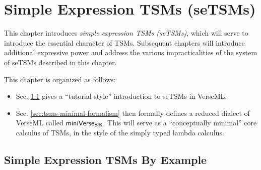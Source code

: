 \chapter{Simple Expression TSMs (seTSMs)}\label{chap:uetsms}
This chapter introduces \emph{simple expression TSMs (seTSMs)}, which will serve to introduce the essential character of TSMs. Subsequent chapters will introduce additional expressive power and address the various impracticalities of the system of seTSMs described in this chapter.

This chapter is organized as follows:%
\begin{itemize}
\item Sec. \ref{sec:tsms-by-example} gives a ``tutorial-style'' introduction to seTSMs in VerseML. %
\item Sec. \ref{sec:tsms-minimal-formalism} then formally defines a reduced dialect of VerseML called $\mathsf{miniVerse}_\textbf{SE}$. This will serve as a ``conceptually minimal'' core calculus of TSMs, in the style of the simply typed lambda calculus.   %
\end{itemize}

\section{Simple Expression TSMs By Example}\label{sec:tsms-by-example}

